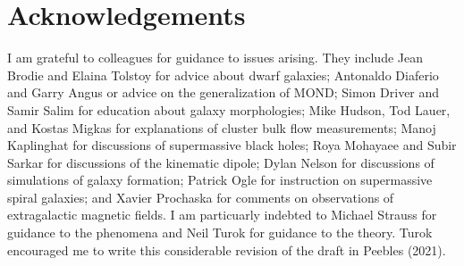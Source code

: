 \documentclass[fleqn,12pt]{article}
\begin{document}
\section{Acknowledgements}

I am grateful to colleagues for guidance to issues arising. They include Jean Brodie and Elaina Tolstoy for advice about dwarf galaxies; Antonaldo Diaferio and Garry Angus or advice on the generalization of MOND; Simon Driver and Samir Salim for education about galaxy morphologies; Mike Hudson, Tod Lauer, and Kostas Migkas for explanations of cluster bulk flow measurements; Manoj Kaplinghat for discussions of supermassive black holes; Roya Mohayaee and Subir Sarkar for discussions of the kinematic dipole; Dylan Nelson for discussions of simulations of galaxy formation; Patrick Ogle for instruction on supermassive spiral galaxies; and Xavier Prochaska for comments on observations of extragalactic magnetic fields. I am particuarly indebted to Michael Strauss for guidance to the phenomena and Neil Turok for guidance to the theory. Turok encouraged me to write this considerable revision of the draft in Peebles (2021).
\end{document}
